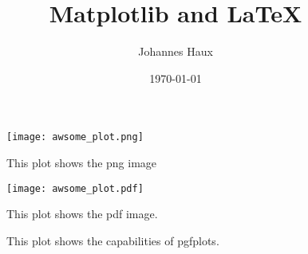 \documentclass[a4paper, 11pt]{article}
\title{Matplotlib and \LaTeX}
\author{Johannes Haux}
\date{\today}
\begin{document}
\renewcommand*\rmdefault{ppl}

\maketitle

\begin{figure}
    \centering
    \texttt{[image: awsome\_plot.png]}

    \caption{This plot shows the png image}
    \label{fig:png}
\end{figure}

\begin{figure}
    \centering
    \texttt{[image: awsome\_plot.pdf]}

    \caption{This plot shows the pdf image.}
    \label{fig:pdf}
\end{figure}

\begin{figure}
    \hspace{-2.75cm}
    

    \caption{This plot shows the capabilities of pgfplots.}
    \label{fig:pgf}
\end{figure}
\end{document}

